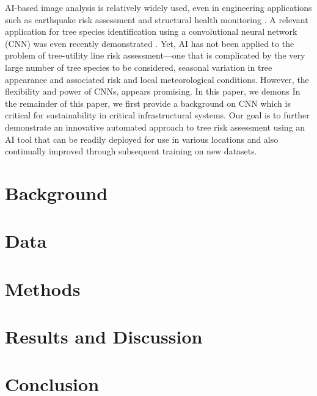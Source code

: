\documentclass[11pt,twoside]{article}
\numberwithin{equation}{section}
\newcommand{\?}{\stackrel{?}{=}}
\begin{document}
AI-based image analysis is relatively widely used, even in engineering applications such as earthquake risk assessment
\cite{jiao2020artificial,salehi2018emerging} and structural health monitoring \cite{spencer2019advances}. A relevant
application for tree species identification using a convolutional neural network (CNN) was even recently demonstrated
\cite{fricker2019convolutional}. Yet, AI has not been applied to the problem of tree-utility line risk assessment---one that is
complicated by the very large number of tree species to be considered, seasonal variation in tree appearance and
associated risk and local meteorological conditions. However, the flexibility and power of CNNs, appears promising. In
this paper, we demons In the remainder of this paper, we first provide a background on CNN which is critical for
sustainability in critical infrastructural systems. Our goal is to further demonstrate an innovative automated approach
to tree risk assessment using an AI tool that can be readily deployed for use in various locations and also continually
improved through subsequent training on new datasets.

\section{Background}
\section{Data}

\section{Methods}

\section{Results and Discussion}

\section{Conclusion}

\printbibliography

\appendix
\end{document}
